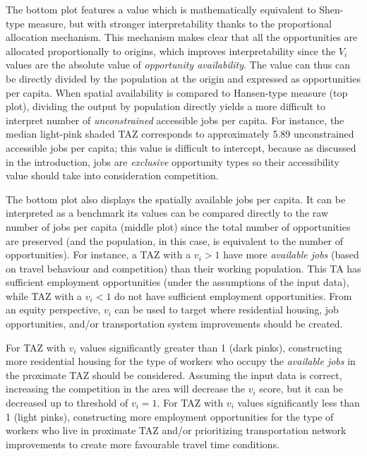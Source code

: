 \documentclass[10pt,letterpaper]{article}
\begin{document}
The bottom plot features a value which is mathematically equivalent to
Shen-type measure, but with stronger interpretability thanks to the
proportional allocation mechanism. This mechanism makes clear that all
the opportunities are allocated proportionally to origins, which
improves interpretability since the \(V_i\) values are the absolute
value of \emph{opportunity availability}. The value can thus can be
directly divided by the population at the origin and expressed as
opportunities per capita. When spatial availability is compared to
Hansen-type measure (top plot), dividing the output by population
directly yields a more difficult to interpret number of
\emph{unconstrained} accessible jobs per capita. For instance, the
median light-pink shaded TAZ corresponds to approximately 5.89
unconstrained accessible jobs per capita; this value is difficult to
intercept, because as discussed in the introduction, jobs are
\emph{exclusive} opportunity types so their accessibility value should
take into consideration competition.

The bottom plot also displays the spatially available jobs per capita.
It can be interpreted as a benchmark its values can be compared directly
to the raw number of jobs per capita (middle plot) since the total
number of opportunities are preserved (and the population, in this case,
is equivalent to the number of opportunities). For instance, a TAZ with
a \(v_i > 1\) have more \emph{available jobs} (based on travel behaviour
and competition) than their working population. This TA has sufficient
employment opportunities (under the assumptions of the input data),
while TAZ with a \(v_i < 1\) do not have sufficient employment
opportunities. From an equity perspective, \(v_i\) can be used to target
where residential housing, job opportunities, and/or transportation
system improvements should be created.

For TAZ with \(v_i\) values significantly greater than 1 (dark pinks),
constructing more residential housing for the type of workers who occupy
the \emph{available jobs} in the proximate TAZ should be considered.
Assuming the input data is correct, increasing the competition in the
area will decrease the \(v_i\) score, but it can be decreased up to
threshold of \(v_i = 1\). For TAZ with \(v_i\) values significantly less
than 1 (light pinks), constructing more employment opportunities for the
type of workers who live in proximate TAZ and/or prioritizing
transportation network improvements to create more favourable travel
time conditions.
\end{document}
